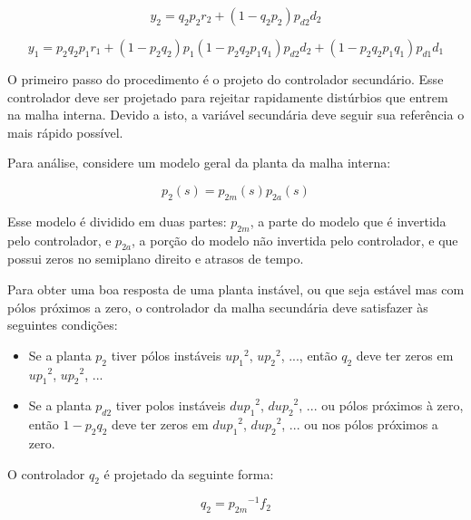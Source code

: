     \begin{equation}
        y_2 = q_2 p_2 r_2 + \left( 1- q_2 p_2 \right) p_{d2} d_2
    \end{equation}

    \begin{equation}
        y_1 = p_2 q_2 p_1 r_1 + \left( 1 - p_2 q_2 \right) p_1 \left(
            1 - p_2 q_2 p_1 q_1 \right) p_{d2} d_2 + \left( 1 - p_2 q_2 p_1 q_1
            \right) p_{d1} d_1
    \end{equation}

    O primeiro passo do procedimento é o projeto do controlador secundário. Esse controlador deve ser projetado para rejeitar rapidamente distúrbios que entrem na malha interna. Devido a isto, a variável secundária deve seguir sua referência o mais rápido possível.

    Para análise, considere um modelo geral da planta da malha interna:

    \begin{equation}
        p_2(s) = p_{2m}(s) p_{2a}(s)
    \end{equation}

    Esse modelo é dividido em duas partes: $p_{2m}$, a parte do modelo que é invertida pelo controlador, e $p_{2a}$, a porção do modelo não invertida pelo controlador, e que possui zeros no semiplano direito e atrasos de tempo.

    Para obter uma boa resposta de uma planta instável, ou que seja estável mas com pólos próximos a zero, o controlador da malha secundária deve satisfazer às seguintes condições:

    \begin{itemize}
        \item Se a planta $p_2$ tiver pólos instáveis
        	${up_1}^2$, ${up_2}^2$, ..., então $q_2$ deve ter zeros em
        	${up_1}^2$, ${up_2}^2$, ...
        \item Se a planta $p_{d2}$ tiver polos instáveis
        	${dup_1}^2$, ${dup_2}^2$, ... ou pólos próximos à zero, então
        	$1 - p_2 q_2$ deve ter zeros em ${dup_1}^2$, ${dup_2}^2$, ...
        	ou nos pólos próximos a zero.
    \end{itemize}

    O controlador $q_2$ é projetado da seguinte forma:

    \begin{equation}
        q_2 = {p_{2m}}^{-1} f_2
    \end{equation}

